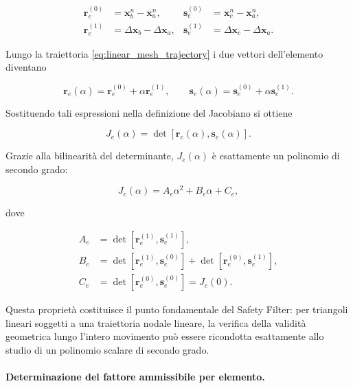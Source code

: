 \begin{align}
\mathbf{r}_{e}^{(0)}
&=
\mathbf{x}_b^n-\mathbf{x}_a^n,
&
\mathbf{s}_{e}^{(0)}
&=
\mathbf{x}_c^n-\mathbf{x}_a^n,
\\
\mathbf{r}_{e}^{(1)}
&=
\Delta\mathbf{x}_b-\Delta\mathbf{x}_a,
&
\mathbf{s}_{e}^{(1)}
&=
\Delta\mathbf{x}_c-\Delta\mathbf{x}_a.
\end{align}

Lungo la traiettoria \eqref{eq:linear_mesh_trajectory} i due vettori dell'elemento diventano

\begin{equation}
\mathbf{r}_e(\alpha)
=
\mathbf{r}_e^{(0)}
+
\alpha\mathbf{r}_e^{(1)},
\qquad
\mathbf{s}_e(\alpha)
=
\mathbf{s}_e^{(0)}
+
\alpha\mathbf{s}_e^{(1)}.
\label{eq:edge_trajectory}
\end{equation}

Sostituendo tali espressioni nella definizione del Jacobiano si ottiene

\begin{equation}
J_e(\alpha)
=
\det
\left[
\mathbf{r}_e(\alpha),
\mathbf{s}_e(\alpha)
\right].
\label{eq:jacobian_alpha}
\end{equation}

Grazie alla bilinearità del determinante, $J_e(\alpha)$ è esattamente un polinomio di secondo grado:

\begin{equation}
J_e(\alpha)
=
A_e\alpha^2
+
B_e\alpha
+
C_e,
\label{eq:jacobian_quadratic}
\end{equation}

dove

\begin{align}
A_e
&=
\det
\left[
\mathbf{r}_e^{(1)},
\mathbf{s}_e^{(1)}
\right],
\label{eq:quadratic_A}
\\
B_e
&=
\det
\left[
\mathbf{r}_e^{(1)},
\mathbf{s}_e^{(0)}
\right]
+
\det
\left[
\mathbf{r}_e^{(0)},
\mathbf{s}_e^{(1)}
\right],
\label{eq:quadratic_B}
\\
C_e
&=
\det
\left[
\mathbf{r}_e^{(0)},
\mathbf{s}_e^{(0)}
\right]
=
J_e(0).
\label{eq:quadratic_C}
\end{align}

Questa proprietà costituisce il punto fondamentale del Safety Filter: per triangoli lineari soggetti a una traiettoria nodale lineare, la verifica della validità geometrica lungo l'intero movimento può essere ricondotta esattamente allo studio di un polinomio scalare di secondo grado.

\paragraph{Determinazione del fattore ammissibile per elemento.}

